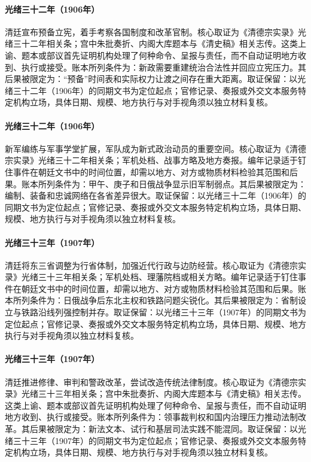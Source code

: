 \hypertarget{ledger:EQ-1906-CONSTITUTIONAL-PROMISE}{}\paragraph{光绪三十二年（1906年）}清廷宣布预备立宪，着手考察各国制度和改革官制。核心取证为《清德宗实录》光绪三十二年相关条；宫中朱批奏折、内阁大库题本与《清史稿》相关志传。这类上谕、题本或部议首先证明机构处理了何种命令、呈报与责任，而不自动证明地方收到、执行或接受。账本所列条件为：新政需要重建统治合法性并回应立宪压力。其后果被限定为：“预备”时间表和实际权力让渡之间存在重大距离。取证保留：以光绪三十二年（1906年）的同期文书为定位起点；官修记录、奏报或外交文本服务特定机构立场，具体日期、规模、地方执行与对手视角须以独立材料复核。
\hypertarget{ledger:EQ-1906-NEW-ARMY-REFORM}{}\paragraph{光绪三十二年（1906年）}新军编练与军事学堂扩展，军队成为新式政治动员的重要空间。核心取证为《清德宗实录》光绪三十二年相关条；军机处档、战事方略及地方奏报。编年记录适于钉住事件在朝廷文书中的时间位置，却需以地方、对方或物质材料检验其范围和后果。账本所列条件为：甲午、庚子和日俄战争显示旧军制弱点。其后果被限定为：编制、装备和忠诚网络在各省差异很大。取证保留：以光绪三十二年（1906年）的同期文书为定位起点；官修记录、奏报或外交文本服务特定机构立场，具体日期、规模、地方执行与对手视角须以独立材料复核。
\hypertarget{ledger:EQ-1907-MANCHURIAN-PROVINCES}{}\paragraph{光绪三十三年（1907年）}清廷将东三省调整为行省体制，加强近代行政与边防经营。核心取证为《清德宗实录》光绪三十三年相关条；军机处档、理藩院档或相关方略。编年记录适于钉住事件在朝廷文书中的时间位置，却需以地方、对方或物质材料检验其范围和后果。账本所列条件为：日俄战争后东北主权和铁路问题尖锐化。其后果被限定为：省制设立与铁路沿线列强控制并存。取证保留：以光绪三十三年（1907年）的同期文书为定位起点；官修记录、奏报或外交文本服务特定机构立场，具体日期、规模、地方执行与对手视角须以独立材料复核。
\hypertarget{ledger:EQ-1907-QING-LEGAL-REFORM}{}\paragraph{光绪三十三年（1907年）}清廷推进修律、审判和警政改革，尝试改造传统法律制度。核心取证为《清德宗实录》光绪三十三年相关条；宫中朱批奏折、内阁大库题本与《清史稿》相关志传。这类上谕、题本或部议首先证明机构处理了何种命令、呈报与责任，而不自动证明地方收到、执行或接受。账本所列条件为：领事裁判权和国内治理压力推动法制改革。其后果被限定为：新法文本、试行和基层司法实践不能混同。取证保留：以光绪三十三年（1907年）的同期文书为定位起点；官修记录、奏报或外交文本服务特定机构立场，具体日期、规模、地方执行与对手视角须以独立材料复核。
